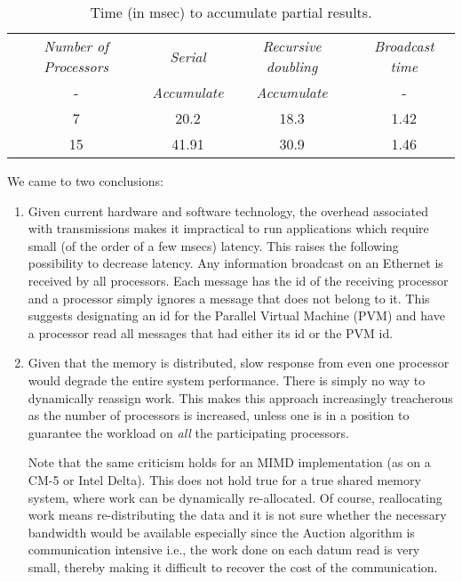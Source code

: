 \begin{table}[hbt]
\begin{center}
\begin{tabular}{|c|c|c|c|} \hline \hline
{\em Number of Processors} & {\em  Serial } &  {\em Recursive doubling } & {\em Broadcast time} \\ 
- & {\em Accumulate} & {\em Accumulate} & - \\ \hline
7  	& 20.2	& 18.3	& 1.42 \\ \hline
15  	& 41.91	& 30.9	& 1.46 \\ \hline \hline
\end{tabular}
\end{center}
\caption{Time (in msec) to accumulate partial results.}
\label{dist_gather_results}
\end{table}

We came to two conclusions:
\begin{enumerate}

\item Given current hardware and software technology, 
the overhead associated with
transmissions makes it impractical to run applications which
require small (of the order of a few msecs) latency.
This raises the following possibility to decrease latency.
Any information broadcast on an Ethernet is received by all processors.
Each message has the id of the receiving processor and a processor simply
ignores a message that does not belong to it. This suggests designating
an id for the Parallel Virtual Machine (PVM) and have a processor
read all messages that had either its id or the PVM id. 

\item Given that the memory is distributed, slow response
from even one processor would degrade the entire system performance.
There is simply no way to dynamically reassign work. This makes
this approach increasingly treacherous as the number of processors
is increased, unless one is in a position to guarantee the workload
on {\em all} the participating processors. 

Note that the
same criticism holds for an MIMD implementation (as on a CM-5 or
Intel Delta). This does not hold true for a true shared memory
system, where work can be dynamically
re-allocated.  Of course, reallocating work means 
re-distributing the data and it is not sure whether the necessary 
bandwidth would be available especially since
the Auction algorithm is communication intensive i.e.,
the work done on each datum read is very small, thereby making it
difficult to recover the cost of the communication.

\end{enumerate}

